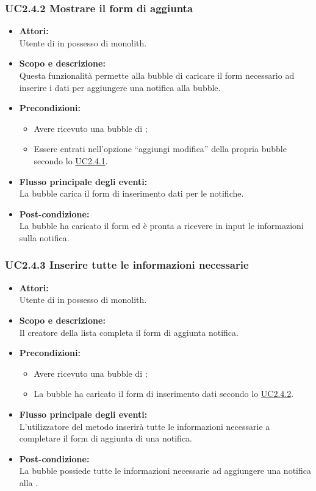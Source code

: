 \subsubsection{UC2.4.2 Mostrare il form di aggiunta} \label{UC2.4.2}

\begin{itemize}
	\item \textbf{Attori:}
	\\Utente di  in possesso di monolith.
	\item \textbf{Scopo e descrizione:} 
	\\Questa funzionalità permette alla bubble di caricare il form necessario ad inserire i dati per aggiungere una notifica alla bubble.
	\item \textbf{Precondizioni:}
	\begin{itemize}
		\item Avere ricevuto una bubble di ;
		\item Essere entrati nell’opzione “aggiungi modifica” della propria bubble secondo lo \hyperref[UC2.4.1]{UC2.4.1}.
	\end{itemize}
	\item \textbf{Flusso principale degli eventi:}
	\\La bubble  carica il form di inserimento dati per le notifiche.
	\item \textbf{Post-condizione:}
	\\La bubble ha caricato il form ed è pronta a ricevere in input le informazioni sulla notifica.
\end{itemize}

\subsubsection{UC2.4.3 Inserire tutte le informazioni necessarie} \label{UC2.4.3}

\begin{itemize}
	\item \textbf{Attori:}
	\\Utente di  in possesso di monolith.
	\item \textbf{Scopo e descrizione:} 
	\\Il creatore della lista completa il form di aggiunta notifica.
	\item \textbf{Precondizioni:}
	\begin{itemize}
		\item Avere ricevuto una bubble di ;
		\item La bubble ha caricato il form di inserimento dati secondo lo \hyperref[UC2.4.2]{UC2.4.2}.
	\end{itemize}
	\item \textbf{Flusso principale degli eventi:}
	\\L’utilizzatore del metodo inserirà tutte le informazioni necessarie a completare il form di aggiunta di una notifica.
	\item \textbf{Post-condizione:}
	\\La bubble possiede tutte le informazioni necessarie ad aggiungere una notifica alla .
\end{itemize}


